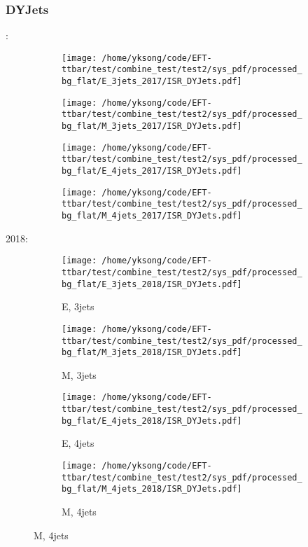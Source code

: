 \documentclass{beamer}
\begin{document}
\begin{frame}
\frametitle{DYJets}
\fontsize{5}{1}:
\begin{figure}
\centering
\begin{subfigure}[b]{0.24\textwidth}
\texttt{[image: /home/yksong/code/EFT-ttbar/test/combine\_test/test2/sys\_pdf/processed\_bg\_flat/E\_3jets\_2017/ISR\_DYJets.pdf]}
\end{subfigure}
\begin{subfigure}[b]{0.24\textwidth}
\texttt{[image: /home/yksong/code/EFT-ttbar/test/combine\_test/test2/sys\_pdf/processed\_bg\_flat/M\_3jets\_2017/ISR\_DYJets.pdf]}
\end{subfigure}
\begin{subfigure}[b]{0.24\textwidth}
\texttt{[image: /home/yksong/code/EFT-ttbar/test/combine\_test/test2/sys\_pdf/processed\_bg\_flat/E\_4jets\_2017/ISR\_DYJets.pdf]}
\end{subfigure}
\begin{subfigure}[b]{0.24\textwidth}
\texttt{[image: /home/yksong/code/EFT-ttbar/test/combine\_test/test2/sys\_pdf/processed\_bg\_flat/M\_4jets\_2017/ISR\_DYJets.pdf]}
\end{subfigure}
\end{figure}
2018:
\begin{figure}
\centering
\begin{subfigure}[b]{0.24\textwidth}
\texttt{[image: /home/yksong/code/EFT-ttbar/test/combine\_test/test2/sys\_pdf/processed\_bg\_flat/E\_3jets\_2018/ISR\_DYJets.pdf]}
\captionsetup{font=tiny}
\caption{E, 3jets}
\end{subfigure}
\begin{subfigure}[b]{0.24\textwidth}
\texttt{[image: /home/yksong/code/EFT-ttbar/test/combine\_test/test2/sys\_pdf/processed\_bg\_flat/M\_3jets\_2018/ISR\_DYJets.pdf]}
\captionsetup{font=tiny}
\caption{M, 3jets}
\end{subfigure}
\begin{subfigure}[b]{0.24\textwidth}
\texttt{[image: /home/yksong/code/EFT-ttbar/test/combine\_test/test2/sys\_pdf/processed\_bg\_flat/E\_4jets\_2018/ISR\_DYJets.pdf]}
\captionsetup{font=tiny}
\caption{E, 4jets}
\end{subfigure}
\begin{subfigure}[b]{0.24\textwidth}
\texttt{[image: /home/yksong/code/EFT-ttbar/test/combine\_test/test2/sys\_pdf/processed\_bg\_flat/M\_4jets\_2018/ISR\_DYJets.pdf]}
\captionsetup{font=tiny}
\caption{M, 4jets}
\end{subfigure}
\end{figure}
\end{frame}
\end{document}
